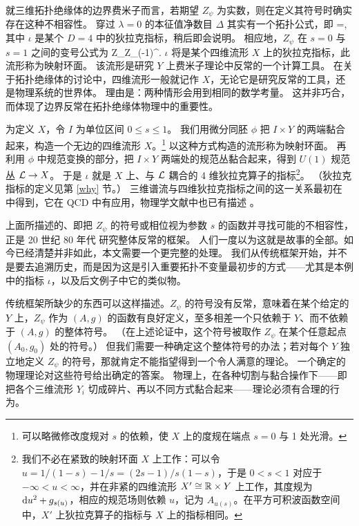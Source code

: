 就三维拓扑绝缘体的边界费米子而言，若期望 $Z_\psi$ 为实数，则在定义其符号时确实存在这种不相容性。
穿过 $\lambda=0$ 的本征值净数目 $\Delta$ 其实有一个拓扑公式，即
\be\label{worf}\Delta=\iota,\ee
其中 $\iota$ 是某个 $D=4$ 中的狄拉克指标，稍后即会说明。
相应地，$Z_\psi$ 在 $s=0$ 与 $s=1$ 之间的变号公式为
\be\label{torf}Z_\psi\to Z_\psi (-1)^\iota.\ee
$\iota$ 将是某个四维流形 $X$ 上的狄拉克指标，此流形称为映射环面。
该流形是研究 $Y$ 上费米子理论中反常的一个计算工具。
在关于拓扑绝缘体的讨论中，四维流形一般就记作 $X$，无论它是研究反常的工具，还是物理系统的世界体。
理由是：两种情形会用到相同的数学考量。
这并非巧合，而体现了边界反常在拓扑绝缘体物理中的重要性。

为定义 $X$，令 $I$ 为单位区间 $0\leq s\leq 1$。
我们用微分同胚 $\phi$ 把 $I\times Y$ 的两端黏合起来，构造一个无边的四维流形 $X$。\footnote{可以略微修改度规对 $s$ 的依赖，使 $X$ 上的度规在端点 $s=0$ 与 1 处光滑。}
以这种方式构造的流形称为映射环面。
再利用 $\phi$ 中规范变换的部分，把 $I\times Y$ 两端处的规范丛黏合起来，得到 $U(1)$ 规范丛 ${\mathcal L}\to X$。
于是 $\iota$ 就是 $X$ 上、与 ${\mathcal L}$ 耦合的 4 维狄拉克算子的指标\footnote{\label{helpful}我们不必在紧致的映射环面 $X$ 上工作：可以令 $u=1/(1-s)-1/s=(2s-1)/s(1-s)$，于是 $0<s<1$ 对应于 $-\infty<u<\infty$，并在非紧的四维流形 $X'\cong{\mathbb{R}}\times Y$ 上工作，其度规为 ${\mathrm d} u^2+ g_{s(u)}$，相应的规范场则依赖 $u$，记为 $A_{u(s)}$。在平方可积波函数空间中，$X'$ 上狄拉克算子的指标与 $X$ 上的指标相同。}。
（狄拉克指标的定义见第 \ref{why} 节。）
三维谱流与四维狄拉克指标之间的这一关系最初在 \cite{APS} 中得到，它在 QCD 中有应用，物理学文献中也已有描述 \cite{DCG,Kiskis}。

上面所描述的、即把 $Z_\psi$ 的符号或相位视为参数 $s$ 的函数并寻找可能的不相容性，正是 20 世纪 80 年代 \cite{Witold,Witoldtwo,Global} 研究整体反常的框架。
人们一度以为这就是故事的全部。如今已经清楚并非如此，本文需要一个更完整的处理。
我们从传统框架开始，并不是要去追溯历史，而是因为这是引入重要拓扑不变量最初步的方式——尤其是本例中的指标 $\iota$，以及后文例子中它的类似物。

传统框架所缺少的东西可以这样描述。$Z_\psi$ 的符号没有反常，意味着在某个给定的 $Y$ 上，$Z_\psi$ 作为 $(A,g)$ 的函数有良好定义，至多相差一个只依赖于 $Y$、而不依赖于 $(A,g)$ 的整体符号。
（在上述论证中，这个符号被取作 $Z_\psi$ 在某个任意起点 $(A_0,g_0)$ 处的符号。）
但我们需要一种确定这个整体符号的办法；若对每个 $Y$ 独立地定义 $Z_\psi$ 的符号，那就肯定不能指望得到一个令人满意的理论。
一个确定的物理理论对这些符号给出确定的答案。
物理上，在各种切割与黏合操作下——即把各个三维流形 $Y_i$ 切成碎片、再以不同方式黏合起来——理论必须有合理的行为。

